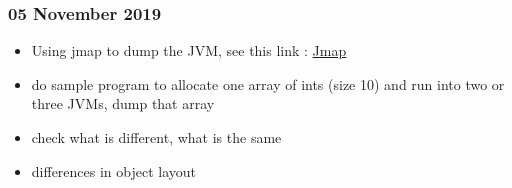 \subsubsection{05 November 2019}

\begin{itemize}
\item Using jmap to dump the JVM, see this link : \href{https://stackoverflow.com/questions/32605962/locate-and-read-objects-of-a-specific-type-from-memory-of-a-running-java-program}{Jmap}
\item do sample program to allocate one array of ints (size 10) and run into two or three JVMs, dump that array
\item check what is different, what is the same
\item differences in object layout
\end{itemize}